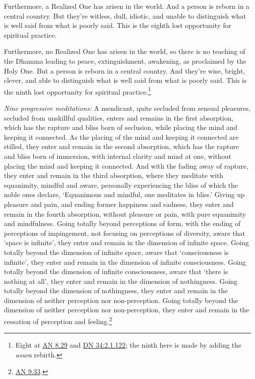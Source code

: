 \documentclass[12pt,openany]{book}%
\begin{document}
Furthermore, a Realized One has arisen in the world. And a person is reborn in a central country. But they’re witless, dull, idiotic, and unable to distinguish what is well said from what is poorly said. This is the eighth lost opportunity for spiritual practice. 

Furthermore, no Realized One has arisen in the world, so there is no teaching of the Dhamma leading to peace, extinguishment, awakening, as proclaimed by the Holy One. But a person is reborn in a central country. And they’re wise, bright, clever, and able to distinguish what is well said from what is poorly said. This is the ninth lost opportunity for spiritual practice.\footnote{Eight at \href{https://suttacentral.net/an8.29/en/sujato}{AN 8.29} and \href{https://suttacentral.net/dn34/en/sujato\#2.1.122}{DN 34:2.1.122}; the ninth here is made by adding the \textit{asura} rebirth. } 

\emph{Nine progressive meditations:} A mendicant, quite secluded from sensual pleasures, secluded from unskillful qualities, enters and remains in the first absorption, which has the rapture and bliss born of seclusion, while placing the mind and keeping it connected. As the placing of the mind and keeping it connected are stilled, they enter and remain in the second absorption, which has the rapture and bliss born of immersion, with internal clarity and mind at one, without placing the mind and keeping it connected. And with the fading away of rapture, they enter and remain in the third absorption, where they meditate with equanimity, mindful and aware, personally experiencing the bliss of which the noble ones declare, ‘Equanimous and mindful, one meditates in bliss.’ Giving up pleasure and pain, and ending former happiness and sadness, they enter and remain in the fourth absorption, without pleasure or pain, with pure equanimity and mindfulness. Going totally beyond perceptions of form, with the ending of perceptions of impingement, not focusing on perceptions of diversity, aware that ‘space is infinite’, they enter and remain in the dimension of infinite space. Going totally beyond the dimension of infinite space, aware that ‘consciousness is infinite’, they enter and remain in the dimension of infinite consciousness. Going totally beyond the dimension of infinite consciousness, aware that ‘there is nothing at all’, they enter and remain in the dimension of nothingness. Going totally beyond the dimension of nothingness, they enter and remain in the dimension of neither perception nor non-perception. Going totally beyond the dimension of neither perception nor non-perception, they enter and remain in the cessation of perception and feeling.\footnote{\href{https://suttacentral.net/an9.33/en/sujato}{AN 9.33}. } 
\end{document}
